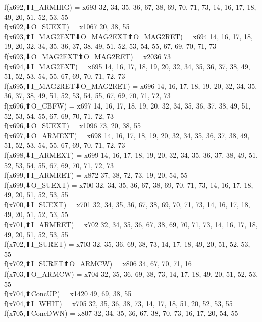 f(x692,⬆I_ARMHIG) = x693 {32, 34, 35, 36, 67, 38, 69, 70, 71, 73, 14, 16, 17, 18, 49, 20, 51, 52, 53, 55} \\
f(x692,⬇O_SUEXT) = x1067 {20, 38, 55} \\
f(x693,⬆I_MAG2EXT⬇O_MAG2EXT⬆O_MAG2RET) = x694 {14, 16, 17, 18, 19, 20, 32, 34, 35, 36, 37, 38, 49, 51, 52, 53, 54, 55, 67, 69, 70, 71, 73} \\
f(x693,⬇O_MAG2EXT⬆O_MAG2RET) = x2036 {73} \\
f(x694,⬇I_MAG2EXT) = x695 {14, 16, 17, 18, 19, 20, 32, 34, 35, 36, 37, 38, 49, 51, 52, 53, 54, 55, 67, 69, 70, 71, 72, 73} \\
f(x695,⬆I_MAG2RET⬇O_MAG2RET) = x696 {14, 16, 17, 18, 19, 20, 32, 34, 35, 36, 37, 38, 49, 51, 52, 53, 54, 55, 67, 69, 70, 71, 72, 73} \\
f(x696,⬆O_CBFW) = x697 {14, 16, 17, 18, 19, 20, 32, 34, 35, 36, 37, 38, 49, 51, 52, 53, 54, 55, 67, 69, 70, 71, 72, 73} \\
f(x696,⬇O_SUEXT) = x1096 {73, 20, 38, 55} \\
f(x697,⬇O_ARMEXT) = x698 {14, 16, 17, 18, 19, 20, 32, 34, 35, 36, 37, 38, 49, 51, 52, 53, 54, 55, 67, 69, 70, 71, 72, 73} \\
f(x698,⬇I_ARMEXT) = x699 {14, 16, 17, 18, 19, 20, 32, 34, 35, 36, 37, 38, 49, 51, 52, 53, 54, 55, 67, 69, 70, 71, 72, 73} \\
f(x699,⬆I_ARMRET) = x872 {37, 38, 72, 73, 19, 20, 54, 55} \\
f(x699,⬇O_SUEXT) = x700 {32, 34, 35, 36, 67, 38, 69, 70, 71, 73, 14, 16, 17, 18, 49, 20, 51, 52, 53, 55} \\
f(x700,⬇I_SUEXT) = x701 {32, 34, 35, 36, 67, 38, 69, 70, 71, 73, 14, 16, 17, 18, 49, 20, 51, 52, 53, 55} \\
f(x701,⬆I_ARMRET) = x702 {32, 34, 35, 36, 67, 38, 69, 70, 71, 73, 14, 16, 17, 18, 49, 20, 51, 52, 53, 55} \\
f(x702,⬆I_SURET) = x703 {32, 35, 36, 69, 38, 73, 14, 17, 18, 49, 20, 51, 52, 53, 55} \\
f(x702,⬆I_SURET⬆O_ARMCW) = x806 {34, 67, 70, 71, 16} \\
f(x703,⬆O_ARMCW) = x704 {32, 35, 36, 69, 38, 73, 14, 17, 18, 49, 20, 51, 52, 53, 55} \\
f(x704,⬆ConcUP) = x1420 {49, 69, 38, 55} \\
f(x704,⬆I_WHIT) = x705 {32, 35, 36, 38, 73, 14, 17, 18, 51, 20, 52, 53, 55} \\
f(x705,⬆ConcDWN) = x807 {32, 34, 35, 36, 67, 38, 70, 73, 16, 17, 20, 54, 55} \\

